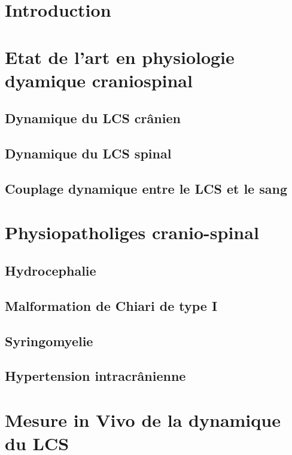 \documentclass{report}
\begin{document}
\section{Introduction}

\section{Etat de l'art en physiologie dyamique craniospinal}

\subsection{Dynamique du LCS crânien}

\subsection{Dynamique du LCS spinal}

\subsection{Couplage dynamique entre le LCS et le sang}

\section{Physiopatholiges cranio-spinal}

\subsection{Hydrocephalie}

\subsection{Malformation de Chiari de type I}

\subsection{Syringomyelie}

\subsection{Hypertension intracrânienne}

\section{Mesure in Vivo de la dynamique du LCS}
\end{document}
